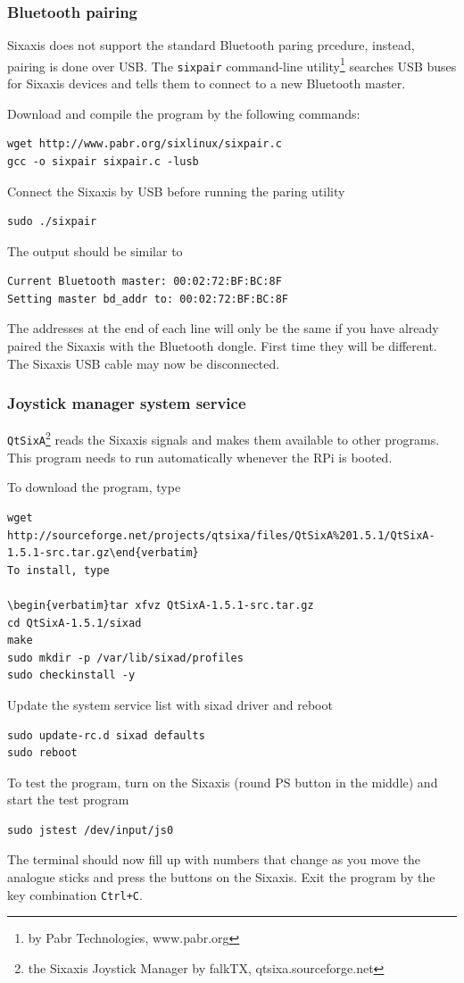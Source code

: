 \documentclass[a4paper,english]{report}
\begin{document}
\subsubsection{Bluetooth pairing}\label{par: Bluetooth-pairing}
Sixaxis does not support the standard Bluetooth paring prcedure, instead, pairing is done over USB. The \texttt{sixpair} command-line utility\footnote{by Pabr Technologies, www.pabr.org} searches USB buses for Sixaxis devices and tells them to connect to a new Bluetooth master.

Download and compile the program by the following commands:
\begin{verbatim}wget http://www.pabr.org/sixlinux/sixpair.c
gcc -o sixpair sixpair.c -lusb\end{verbatim}
Connect the Sixaxis by USB before running the paring utility
\begin{verbatim}sudo ./sixpair\end{verbatim}
The output should be similar to
\begin{verbatim}Current Bluetooth master: 00:02:72:BF:BC:8F
Setting master bd_addr to: 00:02:72:BF:BC:8F\end{verbatim}
The addresses at the end of each line will only be the same if you have already paired the Sixaxis with the Bluetooth dongle. First time they will be different. The Sixaxis USB cable may now be disconnected.

\subsubsection{Joystick manager system service}
\texttt{QtSixA}\footnote{the Sixaxis Joystick Manager by falkTX, qtsixa.sourceforge.net} reads the Sixaxis signals and makes them available to other programs. This program needs to run automatically whenever the RPi is booted.

To download the program, type
\begin{verbatim}wget http://sourceforge.net/projects/qtsixa/files/QtSixA%201.5.1/QtSixA-1.5.1-src.tar.gz\end{verbatim}
To install, type

\begin{verbatim}tar xfvz QtSixA-1.5.1-src.tar.gz
cd QtSixA-1.5.1/sixad
make
sudo mkdir -p /var/lib/sixad/profiles
sudo checkinstall -y\end{verbatim}
Update the system service list with sixad driver and reboot
\begin{verbatim}sudo update-rc.d sixad defaults
sudo reboot\end{verbatim}
To test the program, turn on the Sixaxis (round PS button in the middle) and start the test program
\begin{verbatim}sudo jstest /dev/input/js0\end{verbatim}
The terminal should now fill up with numbers that change as you move the analogue sticks and press the buttons on the Sixaxis. Exit the program by the key combination \texttt{Ctrl+C}.
\end{document}
